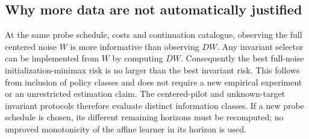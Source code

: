 \subsection{Why more data are not automatically justified}
At the same probe schedule, costs and continuation catalogue, observing the full centered noise $W$ is more informative than observing $DW$.
Any invariant selector can be implemented from $W$ by computing $DW$.
Consequently the best full-noise initialization-minimax risk is no larger than the best invariant risk.
This follows from inclusion of policy classes and does not require a new empirical experiment or an unrestricted estimation claim.
The centered-pilot and unknown-target invariant protocols therefore evaluate distinct information classes.
If a new probe schedule is chosen, its different remaining horizons must be recomputed; no unproved monotonicity of the affine learner in its horizon is used.
